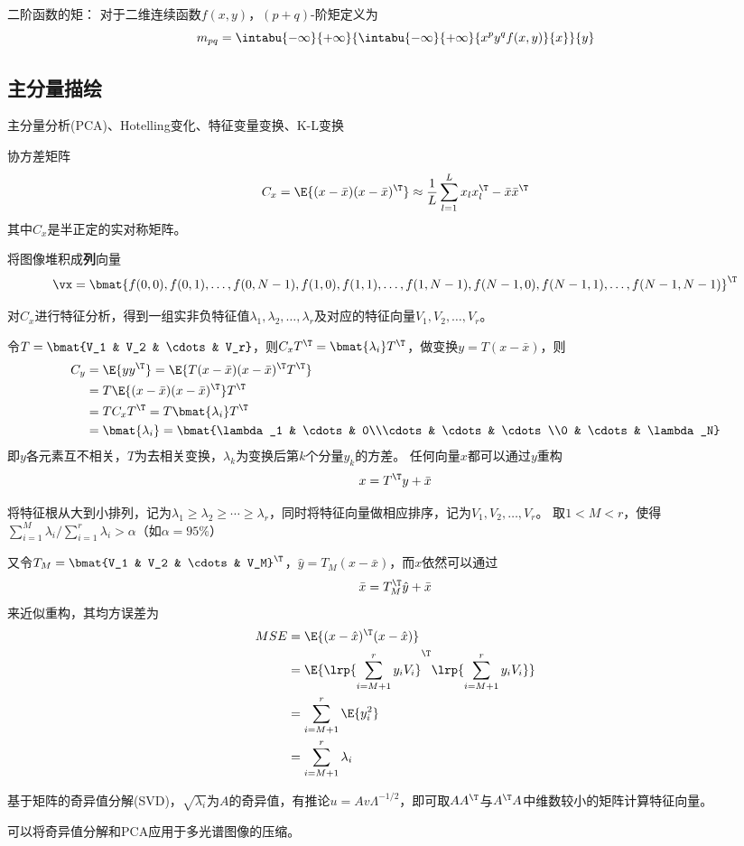 二阶函数的矩：
对于二维连续函数$f(x,y)$，$(p+q)$-阶矩定义为
\[m_{pq}=\intabu{-\infty}{+\infty}{\intabu{-\infty}{+\infty}{x^py^qf(x,y)}{x}}{y}\]


\subsection{主分量描绘}
主分量分析(PCA)、Hotelling变化、特征变量变换、K-L变换

协方差矩阵
\[C_x=\E{(x-\bar{x})(x-\bar{x})^\T}\approx\frac{1}{L}\sum_{l=1}^Lx_lx_l^\T-\bar{x}\bar{x}^\T\]
其中$C_x$是半正定的实对称矩阵。

将图像堆积成\textbf{列}向量
\[\vx=\bmat{f(0,0), f(0,1), \ldots, f(0,N-1), f(1,0), f(1,1), \ldots, f(1,N-1), f(N-1,0), f(N-1,1), \ldots, f(N-1,N-1)}^\T\]

对$C_x$进行特征分析，得到一组实非负特征值$\lambda_1,\lambda_2,\ldots,\lambda_r$及对应的特征向量$V_1,V_2,\ldots,V_r$。

令$T=\bmat{V_1 & V_2 & \cdots & V_r}$，则$C_xT^\T=\bmat{\lambda_i}T^\T$，做变换$y=T(x-\bar{x})$，则
\[\begin{aligned}
C_y&=\E{yy^\T}=\E{T(x-\bar{x})(x-\bar{x})^\T T^\T}\\
&=T\E{(x-\bar{x})(x-\bar{x})^\T}T^\T\\
&=TC_xT^\T=T\bmat{\lambda_i}T^\T\\
&=\bmat{\lambda_i}=\bmat{\lambda_1 & \cdots & 0\\\cdots & \cdots & \cdots\\0 & \cdots & \lambda_N}
\end{aligned}\]
即$y$各元素互不相关，$T$为去相关变换，$\lambda_k$为变换后第$k$个分量$y_k$的方差。
任何向量$x$都可以通过$y$重构
\[x=T^\T y+\bar{x}\]

将特征根从大到小排列，记为$\lambda_1\geq\lambda_2\geq\cdots\geq\lambda_r$，同时将特征向量做相应排序，记为$V_1,V_2,\ldots,V_r$。
取$1<M<r$，使得$\sum_{i=1}^M\lambda_i\Big/\sum_{i=1}^r\lambda_i>\alpha$（如$\alpha=95\%$）

又令$T_M=\bmat{V_1 & V_2 & \cdots & V_M}^\T$，$\hat{y}=T_M(x-\bar{x})$，而$x$依然可以通过
\[\bar{x}=T^\T_M\hat{y}+\bar{x}\]
来近似重构，其均方误差为
\[\begin{aligned}
MSE &= \E{(x-\hat{x})^\T(x-\hat{x})}\\
&=\E{\lrp{\sum_{i=M+1}^r y_iV_i}^\T\lrp{\sum_{i=M+1}^ry_iV_i}}\\
&=\sum_{i=M+1}^r\E{y_i^2}\\
&=\sum_{i=M+1}^r\lambda_i
\end{aligned}\]

基于矩阵的奇异值分解(SVD)，$\sqrt{\lambda_i}$为$A$的奇异值，有推论$u=Av\Lambda^{-1/2}$，即可取$AA^\T$与$A^\T A$中维数较小的矩阵计算特征向量。

可以将奇异值分解和PCA应用于多光谱图像的压缩。
